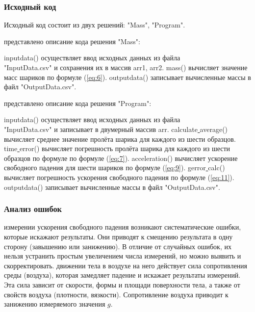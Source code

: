 \subsubsection{Исходный код}
Исходный код состоит из двух решений: "Mass", "Program".

\begin{center} представлено описание кода решения "Mass":\end{center}
 inputdata() осуществляет ввод исходных данных из файла \\"InputData.csv"\verb||
и сохранения их в массив arr1, arr2.
 mass() вычисляет значение масс шариков по формуле (\ref{eq:6}).
 outputdata() записывает вычисленные массы в файл "OutputData.csv".

\begin{center} представлено описание кода решения "Program":\end{center}
 inputdata() осуществляет ввод исходных данных из файла \\"InputData.csv"\verb||
и записывает в двумерный массив arr.
 calculate\underline{ }average() вычисляет среднее значение пролёта шарика для каждого из шести образцов.
 time\underline{ }error() вычисляет погрешность пролёта шарика для каждого из шести образцов по формуле по формуле (\ref{eq:7}).
  acceleration() вычисляет ускорение свободного падения для шести шариков по формуле (\ref{eq:9}).
 gerror\underline{ }calc() вычисляет погрешность ускорения свободного падения по формуле (\ref{eq:11}).
 outputdata() записывает вычисленные массы в файл "OutputData.csv".

\subsubsection{Анализ ошибок}
 измерении ускорения свободного падения возникают систематические ошибки, которые искажают результаты. Они приводят к смещению результата в одну сторону (завышению или занижению). В отличие от случайных ошибок, их нельзя устранить простым увеличением числа измерений, но можно выявить и скорректировать.
 движении тела в воздухе на него действует сила сопротивления среды (воздуха), которая замедляет падение и искажает результаты измерений. Эта сила зависит от скорости, формы и площади поверхности тела, а также от свойств воздуха (плотности, вязкости). Сопротивление воздуха приводит к занижению измеряемого значения $g$.

